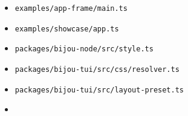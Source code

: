 \begin{itemize}
\tightlist
\item
  \texttt{e\allowbreak{}x\allowbreak{}a\allowbreak{}m\allowbreak{}p\allowbreak{}l\allowbreak{}e\allowbreak{}s\allowbreak{}/\allowbreak{}a\allowbreak{}p\allowbreak{}p\allowbreak{}-\allowbreak{}f\allowbreak{}r\allowbreak{}a\allowbreak{}m\allowbreak{}e\allowbreak{}/\allowbreak{}m\allowbreak{}a\allowbreak{}i\allowbreak{}n\allowbreak{}.\allowbreak{}t\allowbreak{}s}
\item
  \texttt{e\allowbreak{}x\allowbreak{}a\allowbreak{}m\allowbreak{}p\allowbreak{}l\allowbreak{}e\allowbreak{}s\allowbreak{}/\allowbreak{}s\allowbreak{}h\allowbreak{}o\allowbreak{}w\allowbreak{}c\allowbreak{}a\allowbreak{}s\allowbreak{}e\allowbreak{}/\allowbreak{}a\allowbreak{}p\allowbreak{}p\allowbreak{}.\allowbreak{}t\allowbreak{}s}
\item
  \texttt{p\allowbreak{}a\allowbreak{}c\allowbreak{}k\allowbreak{}a\allowbreak{}g\allowbreak{}e\allowbreak{}s\allowbreak{}/\allowbreak{}b\allowbreak{}i\allowbreak{}j\allowbreak{}o\allowbreak{}u\allowbreak{}-\allowbreak{}n\allowbreak{}o\allowbreak{}d\allowbreak{}e\allowbreak{}/\allowbreak{}s\allowbreak{}r\allowbreak{}c\allowbreak{}/\allowbreak{}s\allowbreak{}t\allowbreak{}y\allowbreak{}l\allowbreak{}e\allowbreak{}.\allowbreak{}t\allowbreak{}s}
\item
  \texttt{p\allowbreak{}a\allowbreak{}c\allowbreak{}k\allowbreak{}a\allowbreak{}g\allowbreak{}e\allowbreak{}s\allowbreak{}/\allowbreak{}b\allowbreak{}i\allowbreak{}j\allowbreak{}o\allowbreak{}u\allowbreak{}-\allowbreak{}t\allowbreak{}u\allowbreak{}i\allowbreak{}/\allowbreak{}s\allowbreak{}r\allowbreak{}c\allowbreak{}/\allowbreak{}c\allowbreak{}s\allowbreak{}s\allowbreak{}/\allowbreak{}r\allowbreak{}e\allowbreak{}s\allowbreak{}o\allowbreak{}l\allowbreak{}v\allowbreak{}e\allowbreak{}r\allowbreak{}.\allowbreak{}t\allowbreak{}s}
\item
  \texttt{p\allowbreak{}a\allowbreak{}c\allowbreak{}k\allowbreak{}a\allowbreak{}g\allowbreak{}e\allowbreak{}s\allowbreak{}/\allowbreak{}b\allowbreak{}i\allowbreak{}j\allowbreak{}o\allowbreak{}u\allowbreak{}-\allowbreak{}t\allowbreak{}u\allowbreak{}i\allowbreak{}/\allowbreak{}s\allowbreak{}r\allowbreak{}c\allowbreak{}/\allowbreak{}l\allowbreak{}a\allowbreak{}y\allowbreak{}o\allowbreak{}u\allowbreak{}t\allowbreak{}-\allowbreak{}p\allowbreak{}r\allowbreak{}e\allowbreak{}s\allowbreak{}e\allowbreak{}t\allowbreak{}.\allowbreak{}t\allowbreak{}s}
\item

\end{itemize}
